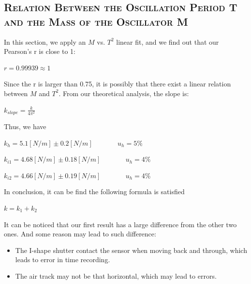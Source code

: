 \documentclass[a4paper,12pt]{article}
\begin{document}
\subsection{\textsc{Relation Between the Oscillation Period T and the Mass of the Oscillator M}}
In this section, we apply an $M$ vs. $T^2$ linear fit, and we find out that our Pearson's r is close to 1:
\begin{center}
$ r = 0.99939 \approx 1 $
\end{center}
Since the r is larger than 0.75, it is possibly that there exist a linear relation between $M$ and $T^2$. From our theoretical analysis, the slope is:
\begin{center}
$ \displaystyle k_{slope} = \frac{k}{4\pi^2} $
\end{center}
\par Thus, we have
\begin{center}
$ k_{h} = 5.1 [N/m] \pm 0.2 [N/m]$ ~~~~~~ $ u_h = 5\% $
\end{center}
\begin{center}
$ k_{i1} = 4.68 [N/m] \pm 0.18 [N/m]$ ~~~~~~ $ u_h = 4\% $
\end{center}
\begin{center}
$ k_{i2} = 4.66 [N/m] \pm 0.19 [N/m]$ ~~~~~~ $ u_h = 4\% $
\end{center}
\par In conclusion, it can be find the following formula is satisfied 
\begin{center}
$ k = k_1 + k_2 $
\end{center}
It can be noticed that our first result has a large difference from the other two ones. And some reason may lead to such difference:
\begin{itemize}
\item The I-shape shutter contact the sensor when moving back and through, which leads to error in time recording.
\item The air track may not be that horizontal, which may lead to errors.
\end{itemize}
\end{document}
